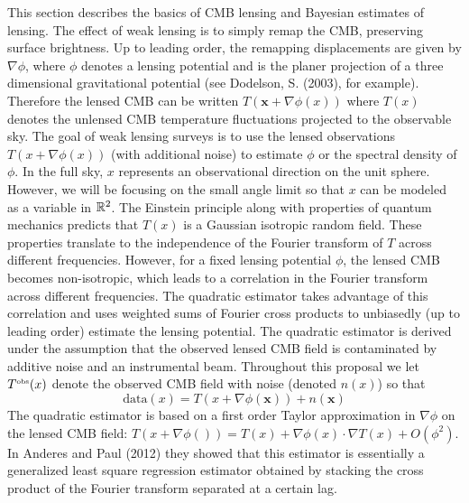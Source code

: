 \documentclass[noinfoline]{imsart}
\newcommand{\bx}{\boldsymbol x}
\begin{document}
This section describes the  basics of CMB lensing and Bayesian estimates of lensing.  The effect of weak lensing is to simply remap the CMB, preserving surface brightness.   Up to leading order, the remapping  displacements are given by $\nabla \phi$, where $\phi$ denotes a lensing potential and is the planer projection of a three dimensional gravitational potential (see Dodelson, S. (2003), for example). Therefore the lensed CMB can  be written $T(\bx + \nabla \phi(x))$ where $T(x)$ denotes the unlensed CMB temperature fluctuations projected to the observable sky.
The goal of weak lensing surveys is to use the lensed observations $T(x + \nabla \phi(x))$  (with additional noise) to  estimate $\phi$ or the spectral density of $\phi$.  In the full sky, $x$ represents an observational direction on the unit sphere. However, we will be focusing on the small angle limit  so that $x$ can be modeled as a variable in $ \Bbb R^2$.  The Einstein principle along with properties of quantum mechanics predicts that $T(x)$   is a Gaussian  isotropic random field. These properties translate to  the independence of the Fourier transform of $T$ across different frequencies.
 However, for a fixed lensing potential $\phi$, the lensed CMB  becomes non-isotropic, which leads to a correlation in the Fourier transform across different frequencies. The quadratic estimator   takes advantage of this correlation and uses weighted sums of Fourier  cross products to unbiasedly (up to leading order) estimate the lensing potential.
The quadratic estimator is derived under the assumption that the observed lensed CMB field is contaminated by additive noise and an instrumental beam. Throughout this proposal we let  $T^\text{\tiny obs}(x)$ denote the observed CMB field  with  noise (denoted $n(x)$) so that  
\[ \text{data}(x)= T(x + \nabla \phi(\bx))+ n(\bx)
 \]
The quadratic estimator is based on a first order Taylor approximation in $\nabla \phi $ on the lensed CMB field:
$T(x+\nabla \phi())= T(x) + \nabla \phi(x)\cdot \nabla T(x)+ O(\phi^2)$. 
In Anderes and Paul (2012) they showed that this estimator is essentially  a generalized least square regression estimator obtained by stacking the cross product of the Fourier transform separated at a certain lag.
\end{document}
